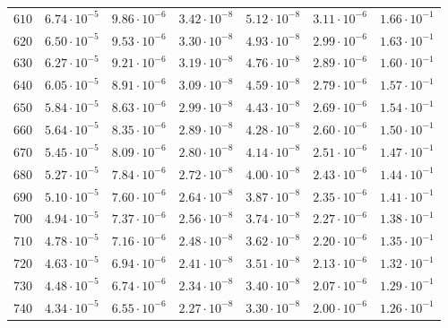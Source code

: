 \begin{table}
\begin{tabular}{lcccccc}
$610 $&$ 6.74\cdot 10^{-5}  $&$ 9.86\cdot 10^{-6}  $&$ 3.42\cdot 10^{-8}  $&$ 5.12\cdot 10^{-8}  $&$ 3.11\cdot 10^{-6}  $&$ 1.66\cdot 10^{-1}  $\\
$620 $&$ 6.50\cdot 10^{-5}  $&$ 9.53\cdot 10^{-6}  $&$ 3.30\cdot 10^{-8}  $&$ 4.93\cdot 10^{-8}  $&$ 2.99\cdot 10^{-6}  $&$ 1.63\cdot 10^{-1}  $\\
$630 $&$ 6.27\cdot 10^{-5}  $&$ 9.21\cdot 10^{-6}  $&$ 3.19\cdot 10^{-8}  $&$ 4.76\cdot 10^{-8}  $&$ 2.89\cdot 10^{-6}  $&$ 1.60\cdot 10^{-1}  $\\
$640 $&$ 6.05\cdot 10^{-5}  $&$ 8.91\cdot 10^{-6}  $&$ 3.09\cdot 10^{-8}  $&$ 4.59\cdot 10^{-8}  $&$ 2.79\cdot 10^{-6}  $&$ 1.57\cdot 10^{-1}  $\\
$650 $&$ 5.84\cdot 10^{-5}  $&$ 8.63\cdot 10^{-6}  $&$ 2.99\cdot 10^{-8}  $&$ 4.43\cdot 10^{-8}  $&$ 2.69\cdot 10^{-6}  $&$ 1.54\cdot 10^{-1}  $\\
$660 $&$ 5.64\cdot 10^{-5}  $&$ 8.35\cdot 10^{-6}  $&$ 2.89\cdot 10^{-8}  $&$ 4.28\cdot 10^{-8}  $&$ 2.60\cdot 10^{-6}  $&$ 1.50\cdot 10^{-1}  $\\
$670 $&$ 5.45\cdot 10^{-5}  $&$ 8.09\cdot 10^{-6}  $&$ 2.80\cdot 10^{-8}  $&$ 4.14\cdot 10^{-8}  $&$ 2.51\cdot 10^{-6}  $&$ 1.47\cdot 10^{-1}  $\\
$680 $&$ 5.27\cdot 10^{-5}  $&$ 7.84\cdot 10^{-6}  $&$ 2.72\cdot 10^{-8}  $&$ 4.00\cdot 10^{-8}  $&$ 2.43\cdot 10^{-6}  $&$ 1.44\cdot 10^{-1}  $\\
$690 $&$ 5.10\cdot 10^{-5}  $&$ 7.60\cdot 10^{-6}  $&$ 2.64\cdot 10^{-8}  $&$ 3.87\cdot 10^{-8}  $&$ 2.35\cdot 10^{-6}  $&$ 1.41\cdot 10^{-1}  $\\
$700 $&$ 4.94\cdot 10^{-5}  $&$ 7.37\cdot 10^{-6}  $&$ 2.56\cdot 10^{-8}  $&$ 3.74\cdot 10^{-8}  $&$ 2.27\cdot 10^{-6}  $&$ 1.38\cdot 10^{-1}  $\\
$710 $&$ 4.78\cdot 10^{-5}  $&$ 7.16\cdot 10^{-6}  $&$ 2.48\cdot 10^{-8}  $&$ 3.62\cdot 10^{-8}  $&$ 2.20\cdot 10^{-6}  $&$ 1.35\cdot 10^{-1}  $\\
$720 $&$ 4.63\cdot 10^{-5}  $&$ 6.94\cdot 10^{-6}  $&$ 2.41\cdot 10^{-8}  $&$ 3.51\cdot 10^{-8}  $&$ 2.13\cdot 10^{-6}  $&$ 1.32\cdot 10^{-1}  $\\
$730 $&$ 4.48\cdot 10^{-5}  $&$ 6.74\cdot 10^{-6}  $&$ 2.34\cdot 10^{-8}  $&$ 3.40\cdot 10^{-8}  $&$ 2.07\cdot 10^{-6}  $&$ 1.29\cdot 10^{-1}  $\\
$740 $&$ 4.34\cdot 10^{-5}  $&$ 6.55\cdot 10^{-6}  $&$ 2.27\cdot 10^{-8}  $&$ 3.30\cdot 10^{-8}  $&$ 2.00\cdot 10^{-6}  $&$ 1.26\cdot 10^{-1}  $\\

\end{tabular}
\end{table}
